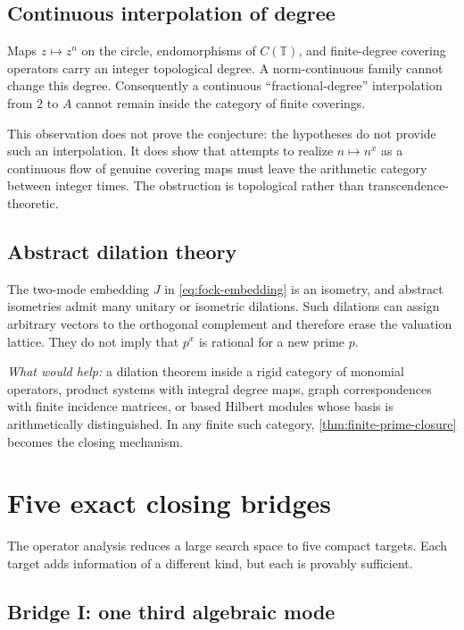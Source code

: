 \documentclass[11pt,oneside]{article}
\theoremstyle{definition}
\theoremstyle{remark}
\begin{document}
\subsection{Continuous interpolation of degree}

Maps \(z\mapsto z^n\) on the circle, endomorphisms of \(C(\mathbb T)\), and
finite-degree covering operators carry an integer topological degree.
A norm-continuous family cannot change this degree.  Consequently a
continuous ``fractional-degree'' interpolation from \(2\) to \(A\)
cannot remain inside the category of finite coverings.

This observation does not prove the conjecture: the hypotheses do not
provide such an interpolation.  It does show that attempts to realize
\(n\mapsto n^x\) as a continuous flow of genuine covering maps must
leave the arithmetic category between integer times.  The obstruction
is topological rather than transcendence-theoretic.

\subsection{Abstract dilation theory}

The two-mode embedding \(J\) in \eqref{eq:fock-embedding} is an
isometry, and abstract isometries admit many unitary or isometric
dilations.  Such dilations can assign arbitrary vectors to the
orthogonal complement and therefore erase the valuation lattice.
They do not imply that \(p^x\) is rational for a new prime \(p\).

\emph{What would help:} a dilation theorem inside a rigid category of
monomial operators, product systems with integral degree maps, graph
correspondences with finite incidence matrices, or based Hilbert
modules whose basis is arithmetically distinguished.  In any finite
such category, \cref{thm:finite-prime-closure} becomes the closing
mechanism.

\section{Five exact closing bridges}

The operator analysis reduces a large search space to five compact
targets.  Each target adds information of a different kind, but each is
provably sufficient.

\subsection{Bridge I: one third algebraic mode}
\end{document}
